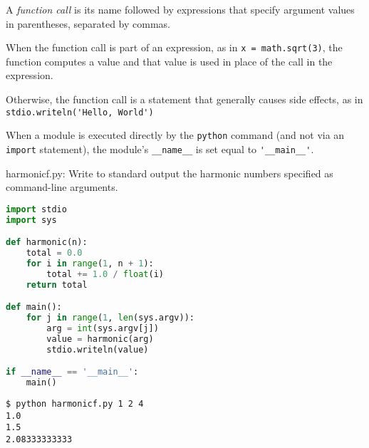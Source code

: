 \documentclass[8pt,a4paper,compress,handout]{beamer}
\begin{document}
\begin{frame}[fragile]
A \emph{function call} is its name followed by expressions that specify argument values in parentheses, separated by commas. 

\bigskip

When the function call is part of an expression, as in \lstinline{x = math.sqrt(3)}, the function computes a value and that value is used in place of the call in the expression. 

\bigskip

Otherwise, the function call is a statement that generally causes side effects, as in \lstinline{stdio.writeln('Hello, World')}

\bigskip

When a module is executed directly by the \lstinline{python} command (and not via an \lstinline{import} statement), the module's \lstinline{__name__} is set equal to \lstinline{'__main__'}.
\end{frame}

\begin{frame}[fragile]
\begin{framed}
\tiny harmonicf.py:  Write to standard output the harmonic numbers specified as command-line arguments.
\end{framed}

\begin{lstlisting}[language=Python]
import stdio
import sys

def harmonic(n):
    total = 0.0
    for i in range(1, n + 1):
        total += 1.0 / float(i)
    return total

def main():
    for j in range(1, len(sys.argv)):
        arg = int(sys.argv[j])
        value = harmonic(arg)
        stdio.writeln(value)

if __name__ == '__main__':
    main()
\end{lstlisting}

\begin{lstlisting}[language={}]
$ python harmonicf.py 1 2 4
1.0
1.5
2.08333333333
\end{lstlisting}
\end{frame}
\end{document}

